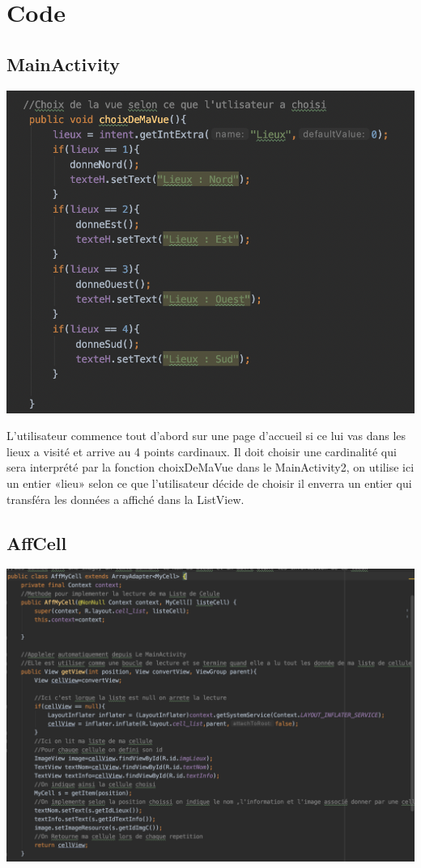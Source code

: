 \documentclass{article}
\begin{document}
{\color{brown}\section{Code}}
\label{section:code}
{\color{olive}\subsection{MainActivity}}
\begin{minipage}{0.5\textwidth}
\includegraphics[width=\textwidth]{code1.png}
\end{minipage}
\hfill
\begin{minipage}{0.45\textwidth}
L’utilisateur commence tout d’abord sur une page d’accueil si ce lui vas dans les lieux a visité et arrive au 4 points cardinaux.
Il doit choisir une cardinalité qui sera interprété par la fonction choixDeMaVue dans le MainActivity2, on utilise ici un entier «lieu» selon ce que l’utilisateur décide de choisir il enverra un entier qui transféra les données a affiché dans la ListView.
\end{minipage}
{\color{olive}\subsection{AffCell}}
\begin{minipage}{0.9\textwidth}
\includegraphics[width=\textwidth]{code2.png}
\end{minipage}
\end{document}
